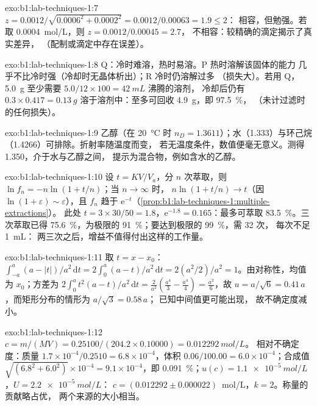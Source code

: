 \begin{solution}{exo:b1:lab-techniques-1:7}
$z = 0.0012/\sqrt{0.0006^2 + 0.0002^2} = 0.0012/0.00063 = 1.9 \le 2$：
相容，但勉强。若取 \qty{0.0004}{mol/L}，则 $z = 0.0012/0.00045 = 2.7$，
不相容：较精确的滴定揭示了真实差异，
（配制或滴定中存在误差）。
\end{solution}

\begin{solution}{exo:b1:lab-techniques-1:8}
Q：冷时难溶，热时易溶。P 热时溶解该固体的能力
几乎不比冷时强（冷却时无晶体析出）；R 冷时仍溶解过多
（损失大）。若用 Q，\qty{5.0}{g} 至少需要
$5.0/12 \times 100 = \qty{42}{mL}$ 沸腾的溶剂，
冷却后仍有 $0.3 \times 0.417 = \qty{0.13}{g}$ 溶于溶剂中：至多可回收
\qty{4.9}{g}，即 \qty{97.5}{\percent}，
（未计过滤时的任何损失）。
\end{solution}

\begin{solution}{exo:b1:lab-techniques-1:9}
乙醇（在 \qty{20}{\celsius} 时 $n_D = 1.3611$）；水（1.333）与环己烷
（1.4266）可排除。折射率随温度而变，
若无温度条件，数值便毫无意义。测得 1.350，介于水与乙醇之间，
提示为混合物，例如含水的乙醇。
\end{solution}

\begin{solution}{exo:b1:lab-techniques-1:10}
设 $t = KV/V_a$，分 $n$ 次萃取，则 $\ln f_n = -n\ln(1 + t/n)$；当 $n \to \infty$ 时，
$n \ln(1 + t/n) \to t$（因 $\ln(1 + \varepsilon) \sim
\varepsilon$），且 $f_n$ 趋于 $\mathrm{e}^{-t}$（\cref{prop:b1:lab-techniques-1:multiple-extractions}）。
此处 $t = 3 \times 30/50 = 1.8$，$\mathrm{e}^{-1.8} = 0.165$：最多可萃取
\qty{83.5}{\percent}。三次萃取已得 \qty{75.6}{\percent}，为极限的
\qty{91}{\percent}；要达到极限的 \qty{99}{\percent}，需 32 次，
每次不足 \qty{1}{mL}：
两三次之后，增益不值得付出这样的工作量。
\end{solution}

\begin{solution}{exo:b1:lab-techniques-1:11}
取 $t = x - x_0$：$\int_{-a}^{a} (a - |t|)/a^2 \,\mathrm{d}t =
2 \int_0^a (a - t)/a^2 \,\mathrm{d}t = 2 (a^2/2)/a^2 = 1$。由对称性，均值为
$x_0$；方差为 $2 \int_0^a t^2 (a - t)/a^2
\,\mathrm{d}t = \frac{2}{a^2}\left(\frac{a^4}{3} - \frac{a^4}{4}\right) =
\frac{a^2}{6}$，故 $u = a/\sqrt6 = 0.41\,a$，而矩形分布的情形为 $a/\sqrt3 = 0.58\,a$；
已知中间值更可能出现，
故不确定度减小。
\end{solution}

\begin{solution}{exo:b1:lab-techniques-1:12}
$c = m/(MV) = 0.25100/(204.2 \times 0.10000) = \qty{0.012292}{mol/L}$。
相对不确定度：质量 $1.7 \times 10^{-4}/0.2510 = 6.8 \times
10^{-4}$，体积 $0.06/100.00 = 6.0 \times 10^{-4}$；合成值
$\sqrt{(6.8^2 + 6.0^2)} \times 10^{-4} = 9.1 \times 10^{-4}$，即
\qty{0.091}{\percent}；$u(c) = \qty{1.1e-5}{mol/L}$，$U = \qty{2.2e-5}{mol/L}$：
$c = (0.012292 \pm 0.000022)$~mol/L，$k = 2$。称量的贡献略占优，
两个来源的大小相当。
\end{solution}

